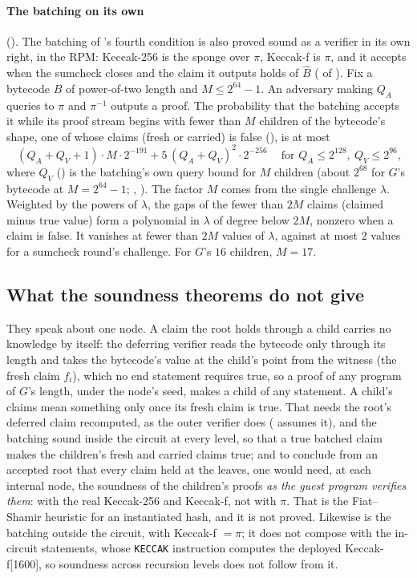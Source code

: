 \documentclass[11pt]{article}
\begin{document}
\paragraph{The batching on its own} (). The batching of 's fourth
condition is also proved sound as a verifier in its own right, in the RPM: Keccak-256 is the sponge
over $\pi$, Keccak-f is $\pi$, and it accepts when the sumcheck closes and the claim it outputs
holds of $\widehat{B}$ ( of ). Fix a bytecode $B$ of power-of-two
length and $M \le 2^{64}-1$. An adversary making $Q_A$ queries to $\pi$ and $\pi^{-1}$ outputs a
proof. The probability that the batching accepts it while its proof stream begins with fewer than
$M$ children of the bytecode's shape, one of whose claims (fresh or carried) is false
(), is at most
\[
\boxed{\ (Q_A + Q_V + 1)\cdot M\cdot 2^{-191} + 5\,(Q_A+Q_V)^2\cdot 2^{-256}\ }
\quad\text{for } Q_A \le 2^{128},\ Q_V \le 2^{96},
\]
where $Q_V$ () is the batching's own query bound for $M$ children (about
$2^{68}$ for $G$'s bytecode at $M = 2^{64}-1$; , ). The factor $M$ comes from
the single challenge $\lambda$. Weighted by the powers of $\lambda$, the gaps of the fewer than $2M$
claims (claimed minus true value) form a polynomial in $\lambda$ of degree below $2M$, nonzero when
a claim is false. It vanishes at fewer than $2M$ values of $\lambda$, against at most $2$ values for
a sumcheck round's challenge. For $G$'s $16$ children, $M = 17$.

\subsection{What the soundness theorems do not give}\label{sec:notgive}

They speak about one node. A claim the root holds through a child carries no knowledge by itself:
the deferring verifier reads the bytecode only through its length and takes the bytecode's value at
the child's point from the witness (the fresh claim $f_i$), which no end statement requires true, so
a proof of any program of $G$'s length, under the node's seed, makes a child of any statement. A
child's claims mean something only once its fresh claim is true. That needs the root's deferred
claim recomputed, as the outer verifier does ( assumes it), and the batching
sound inside the circuit at every level, so that a true batched claim makes the children's fresh and
carried claims true; and to conclude from an accepted root that every claim held at the leaves, one
would need, at each internal node, the soundness of the children's proofs \emph{as the guest
program verifies them}: with the real Keccak-256 and Keccak-f, not with $\pi$. That is the
Fiat--Shamir heuristic for an instantiated hash, and it is not proved. Likewise  is
the batching outside the circuit, with Keccak-f $= \pi$; it does not compose with the in-circuit
statements, whose \texttt{KECCAK} instruction computes the deployed Keccak-f[1600], so soundness
across recursion levels does not follow from it.
\end{document}
